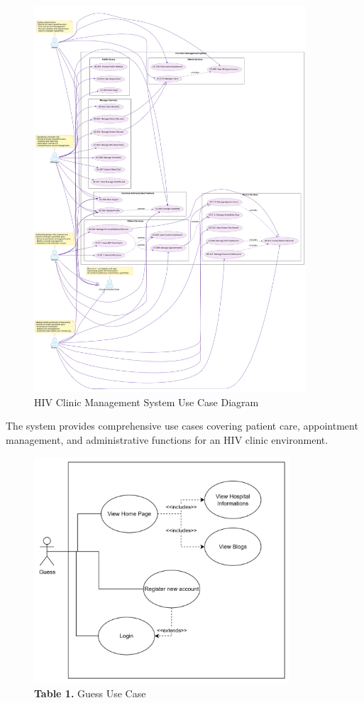 \documentclass[12pt,a4paper]{article}
\begin{document}
\begin{figure}[H]
\centering
\includegraphics[width=0.9\textwidth]{diagrams/use_case_diagram.svg}
\caption{HIV Clinic Management System Use Case Diagram}
\label{fig:use-case-diagram}
\end{figure}

The system provides comprehensive use cases covering patient care, appointment management, and administrative functions for an HIV clinic environment.


\begin{figure}[H]
    \centering
    \includegraphics[width=0.85\textwidth]{diagrams/Picture/Usecase1.png}
    \caption*{\textbf{Table 1.} Guess Use Case}
\end{figure}
\end{document}
